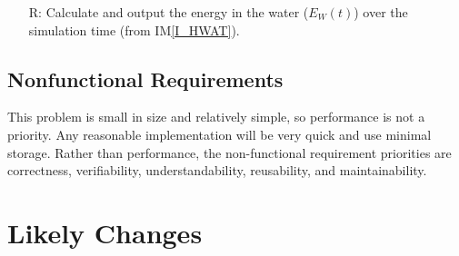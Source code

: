 \documentclass[12pt]{article}
\newcommand{\iref}[1]{IM\ref{#1}}
\newcounter{reqnum} %
\begin{document}
\begin{itemize}
\item[R\refstepcounter{reqnum}\thereqnum \label{R_EnergyWater}:] Calculate and
  output the energy in the water ($E_W(t)$) over the simulation time (from
  \iref{I_HWAT}).




\end{itemize}

\subsection{Nonfunctional Requirements}

This problem is small in size and relatively simple, so performance is not a priority. Any reasonable implementation will be very quick and use minimal storage. Rather than performance, the non-functional requirement priorities are correctness, verifiability, understandability, reusability, and maintainability.

\section{Likely Changes}\label{sec_likelychgs}
\end{document}

